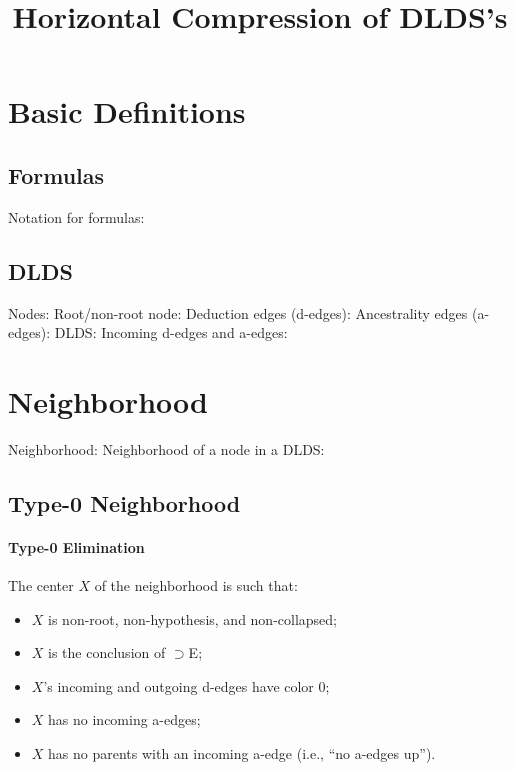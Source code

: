\documentclass[12pt]{article}
\begin{document}
\title{Horizontal Compression of DLDS's}
\maketitle

\section{Basic Definitions}

\subsection{Formulas}

Notation for formulas:

\subsection{DLDS}

Nodes:
Root/non-root node:
Deduction edges (d-edges):
Ancestrality edges (a-edges):
DLDS:
Incoming d-edges and a-edges:

\section{Neighborhood}

Neighborhood:
Neighborhood of a node in a DLDS:

\subsection{Type-0 Neighborhood}

\paragraph{Type-0 Elimination}
The center $X$ of the neighborhood is such that:
\begin{itemize}
\item $X$ is non-root, non-hypothesis, and non-collapsed;
\item $X$ is the conclusion of $⊃$E;
\item $X$'s incoming and outgoing d-edges have color 0;
\item $X$ has no incoming a-edges;
\item $X$ has no parents with an incoming a-edge (i.e., ``no a-edges up'').
\end{itemize}
\end{document}
